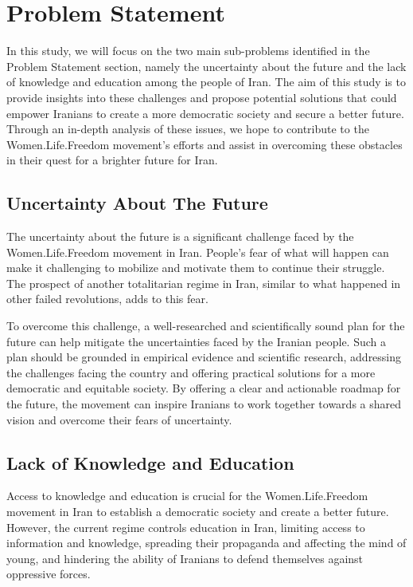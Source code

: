 \documentclass{IEEEtran}
\begin{document}
\section{Problem Statement}

In this study, we will focus on the two main sub-problems identified in the Problem Statement section, namely the uncertainty about the future and the lack of knowledge and education among the people of Iran. The aim of this study is to provide insights into these challenges and propose potential solutions that could empower Iranians to create a more democratic society and secure a better future. Through an in-depth analysis of these issues, we hope to contribute to the Women.Life.Freedom movement's efforts and assist in overcoming these obstacles in their quest for a brighter future for Iran.



\subsection{Uncertainty About The Future}
The uncertainty about the future is a significant challenge faced by the Women.Life.Freedom movement in Iran. 
People's fear of what will happen can make it challenging to mobilize and motivate them to continue their struggle.
The prospect of another totalitarian regime in Iran, similar to what happened in other failed revolutions, adds to this fear.


To overcome this challenge, a well-researched and scientifically sound plan for the future can help mitigate the uncertainties faced by the Iranian people. Such a plan should be grounded in empirical evidence and scientific research, addressing the challenges facing the country and offering practical solutions for a more democratic and equitable society. By offering a clear and actionable roadmap for the future, the movement can inspire Iranians to work together towards a shared vision and overcome their fears of uncertainty.

\subsection{Lack of Knowledge and Education}

Access to knowledge and education is crucial for the Women.Life.Freedom movement in Iran to establish a democratic society and create a better future. However, the current regime controls education in Iran, limiting access to information and knowledge, spreading their propaganda and affecting the mind of young, and hindering the ability of Iranians to defend themselves against oppressive forces.
\end{document}
